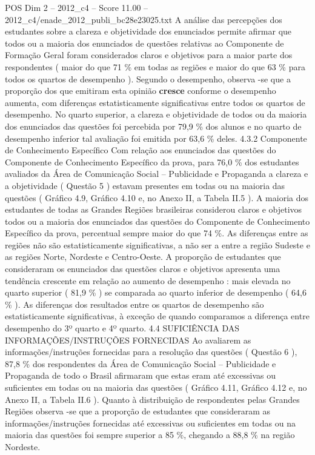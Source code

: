 \begin{textsample}{POS Dim 2 – 2012\_c4 – Score 11.00 – 2012\_c4/enade\_2012\_publi\_bc28e23025.txt}
A análise das percepções dos estudantes sobre a clareza e objetividade dos enunciados permite afirmar que todos ou a maioria dos enunciados de questões relativas ao Componente de Formação Geral foram considerados claros e objetivos para a maior parte dos respondentes ( maior do que 71 \% em todas as regiões e maior do que 63 \% para todos os quartos de desempenho ).
Segundo o desempenho, observa -se que a proporção dos que emitiram esta opinião \textbf{cresce} conforme o desempenho aumenta, com diferenças estatisticamente significativas entre todos os quartos de desempenho.
No quarto superior, a clareza e objetividade de todos ou da maioria dos enunciados das questões foi percebida por 79,9 \% dos alunos e no quarto de desempenho inferior tal avaliação foi emitida por 63,6 \% deles. 4.3.2 Componente de Conhecimento Específico Com relação aos enunciados das questões do Componente de Conhecimento Específico da prova, para 76,0 \% dos estudantes avaliados da Área de Comunicação Social – Publicidade e Propaganda a clareza e a objetividade ( Questão 5 ) estavam presentes em todas ou na maioria das questões ( Gráfico 4.9, Gráfico 4.10 e, no Anexo II, a Tabela II.5 ).
A maioria dos estudantes de todas as Grandes Regiões brasileiras considerou claros e objetivos todos ou a maioria dos enunciados das questões do Componente de Conhecimento Específico da prova, percentual sempre maior do que 74 \%.
As diferenças entre as regiões não são estatisticamente significativas, a não ser a entre a região Sudeste e as regiões Norte, Nordeste e Centro-Oeste.
A proporção de estudantes que consideraram os enunciados das questões claros e objetivos apresenta uma tendência crescente em relação ao aumento de desempenho : mais elevada no quarto superior ( 81,9 \% ) se comparada ao quarto inferior de desempenho ( 64,6 \% ).
As diferenças dos resultados entre os quartos de desempenho são estatisticamente significativas, à exceção de quando comparamos a diferença entre desempenho do 3º quarto e 4º quarto. 4.4 SUFICIÊNCIA DAS INFORMAÇÕES/INSTRUÇÕES FORNECIDAS Ao avaliarem as informações/instruções fornecidas para a resolução das questões ( Questão 6 ), 87,8 \% dos respondentes da Área de Comunicação Social – Publicidade e Propaganda de todo o Brasil afirmaram que estas eram até excessivas ou suficientes em todas ou na maioria das questões ( Gráfico 4.11, Gráfico 4.12 e, no Anexo II, a Tabela II.6 ).
Quanto à distribuição de respondentes pelas Grandes Regiões observa -se que a proporção de estudantes que consideraram as informações/instruções fornecidas até excessivas ou suficientes em todas ou na maioria das questões foi sempre superior a 85 \%, chegando a 88,8 \% na região Nordeste.

\end{textsample}
